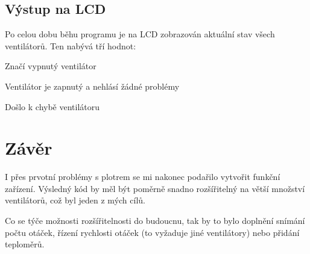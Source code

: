 \documentclass[11pt,a4paper,onecolumn,notitlepage]{article}
\begin{document}
	\subsection{Výstup na LCD}
	Po celou dobu běhu programu je na LCD zobrazován aktuální stav všech ventilátorů. Ten nabývá tří hodnot:
	\begin{description}[leftmargin=3em,style=nextline]
		\item[OFF] Značí vypnutý ventilátor
		\item[OK] Ventilátor je zapnutý a nehlásí žádné problémy
		\item[ERR] Došlo k chybě ventilátoru
	\end{description}
	
	
\section{Závěr}
I přes prvotní problémy s plotrem se mi nakonec podařilo vytvořit funkční zařízení. Výsledný kód by měl být poměrně snadno rozšířitelný na větší množství ventilátorů, což byl jeden z mých cílů.

Co se týče možnosti rozšířitelnosti do budoucnu, tak by to bylo doplnění snímání počtu otáček, řízení rychlosti otáček (to vyžaduje jiné ventilátory) nebo přidání teploměrů.
\end{document}
